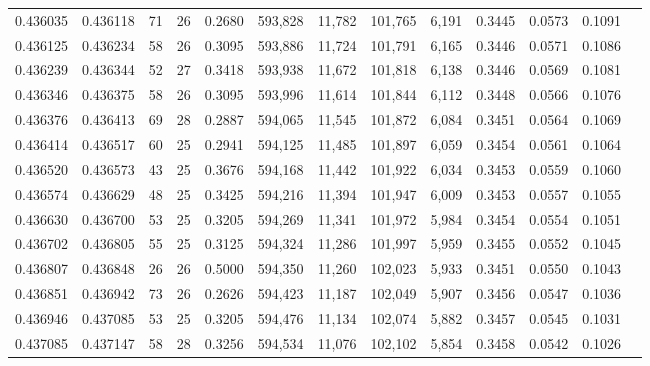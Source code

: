 \begin{tabular}{rrrrrrrrrrrrr}
0.436035 & 0.436118 &    71 &  26 &                                     0.2680 & 593,828 &  11,782 & 101,765 &   6,191 & 0.3445 & 0.0573 & 0.1091 \\
0.436125 & 0.436234 &    58 &  26 &                                     0.3095 & 593,886 &  11,724 & 101,791 &   6,165 & 0.3446 & 0.0571 & 0.1086 \\
0.436239 & 0.436344 &    52 &  27 &                                     0.3418 & 593,938 &  11,672 & 101,818 &   6,138 & 0.3446 & 0.0569 & 0.1081 \\
0.436346 & 0.436375 &    58 &  26 &                                     0.3095 & 593,996 &  11,614 & 101,844 &   6,112 & 0.3448 & 0.0566 & 0.1076 \\
0.436376 & 0.436413 &    69 &  28 &                                     0.2887 & 594,065 &  11,545 & 101,872 &   6,084 & 0.3451 & 0.0564 & 0.1069 \\
0.436414 & 0.436517 &    60 &  25 &                                     0.2941 & 594,125 &  11,485 & 101,897 &   6,059 & 0.3454 & 0.0561 & 0.1064 \\
0.436520 & 0.436573 &    43 &  25 &                                     0.3676 & 594,168 &  11,442 & 101,922 &   6,034 & 0.3453 & 0.0559 & 0.1060 \\
0.436574 & 0.436629 &    48 &  25 &                                     0.3425 & 594,216 &  11,394 & 101,947 &   6,009 & 0.3453 & 0.0557 & 0.1055 \\
0.436630 & 0.436700 &    53 &  25 &                                     0.3205 & 594,269 &  11,341 & 101,972 &   5,984 & 0.3454 & 0.0554 & 0.1051 \\
0.436702 & 0.436805 &    55 &  25 &                                     0.3125 & 594,324 &  11,286 & 101,997 &   5,959 & 0.3455 & 0.0552 & 0.1045 \\
0.436807 & 0.436848 &    26 &  26 &                                     0.5000 & 594,350 &  11,260 & 102,023 &   5,933 & 0.3451 & 0.0550 & 0.1043 \\
0.436851 & 0.436942 &    73 &  26 &                                     0.2626 & 594,423 &  11,187 & 102,049 &   5,907 & 0.3456 & 0.0547 & 0.1036 \\
0.436946 & 0.437085 &    53 &  25 &                                     0.3205 & 594,476 &  11,134 & 102,074 &   5,882 & 0.3457 & 0.0545 & 0.1031 \\
0.437085 & 0.437147 &    58 &  28 &                                     0.3256 & 594,534 &  11,076 & 102,102 &   5,854 & 0.3458 & 0.0542 & 0.1026 \\

\end{tabular}
